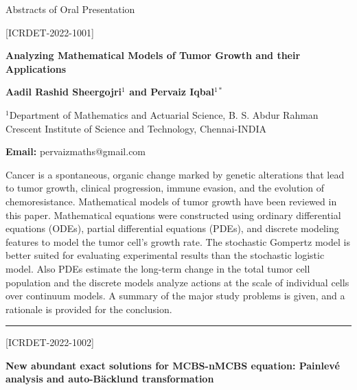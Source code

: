 \documentclass[twoside,11pt]{amsart}
\begin{document}
{\Huge
\begin{center}
Abstracts of Oral Presentation

\end{center}
}
\newpage
\vskip 5mm
\begin{flushleft}
\centerline{[ICRDET-2022-1001]}
\end{flushleft}
\vskip 2mm
\begin{center}\bf\LARGE
Analyzing Mathematical Models of Tumor Growth and their Applications
\end{center}
\vskip 2mm
\centerline{\textbf{ Aadil Rashid Sheergojri$^{1}$ and Pervaiz Iqbal$^{1*}$}}
\vskip 5mm
\begin{flushleft}
$^{1}$Department of Mathematics and Actuarial Science, B. S. Abdur Rahman Crescent Institute of Science and Technology, Chennai-INDIA
\vskip 5mm
\end{flushleft}
\vskip 2mm
\begin{flushleft}
{\bf Email:} pervaizmaths@gmail.com
\end{flushleft}
\vskip 5mm
Cancer is a spontaneous, organic change marked by genetic alterations that lead to tumor growth, clinical progression, immune evasion, and the evolution of chemoresistance. Mathematical models of tumor growth have been reviewed in this paper. Mathematical equations were constructed using ordinary differential equations (ODEs), partial differential equations (PDEs), and discrete modeling features to model the tumor cell's growth rate. The stochastic Gompertz model is better suited for evaluating experimental results than the stochastic logistic model. Also PDEs estimate the long-term change in the total tumor cell population and the discrete models analyze actions at the scale of individual cells over continuum models. A summary of the major study problems is given, and a rationale is provided for the conclusion.
\vskip 5mm
\rule{\textwidth}{0.5pt}
\vskip 5mm
\begin{flushleft}
\centerline{[ICRDET-2022-1002]}
\end{flushleft}
\begin{center}\bf\LARGE
New abundant exact solutions for MCBS-nMCBS
equation: Painlev\'{e} analysis and auto-B\"{a}cklund
transformation
\end{center}
\vskip 5mm
\end{document}
